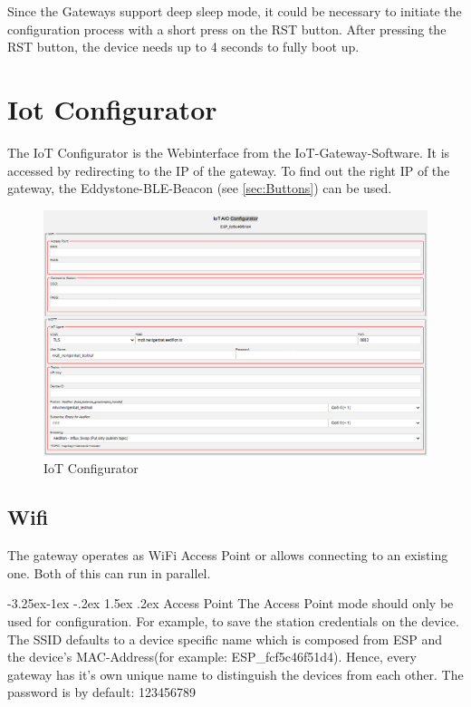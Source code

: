 \documentclass[10pt,letterpaper]{article}
\makeatletter
\renewcommand\paragraph{\@startsection{paragraph}{4}{\z@}%
  {-3.25ex\@plus -1ex \@minus -.2ex}%
  {1.5ex \@plus .2ex}%
  {\normalfont\normalsize\bfseries}}
\makeatother
\begin{document}
	Since the Gateways support deep sleep mode, it could be necessary to initiate the configuration process with a short press on the RST button. After pressing the RST button, the device needs up to 4 seconds to fully boot up.
\newpage
	\section{Iot Configurator}
	The IoT Configurator is the Webinterface from the IoT-Gateway-Software. 
	It is accessed by redirecting to the IP of the gateway. 
	To find out the right IP of the gateway, the Eddystone-BLE-Beacon (see \autoref{sec:Buttons}) can be used.
	
	\begin{figure}[ht!]
		\includegraphics[width=\textwidth]{Figures/configurator.png}
		\caption{IoT Configurator}
		\label{fig:configurator}
	\end{figure}

		\subsection{Wifi}
		The gateway operates as WiFi Access Point or allows connecting to an existing one.
		Both of this can run in parallel.

		\paragraph{Access Point}
		The Access Point mode should only be used for configuration. 
		For example, to save the station credentials on the device.
		The SSID defaults to a device specific name which is composed from ESP and the device's MAC-Address(for example: ESP\_fcf5c46f51d4).
		Hence, every gateway has it's own unique name to distinguish the devices from each other. 
		The password is by default: 123456789
\end{document}
